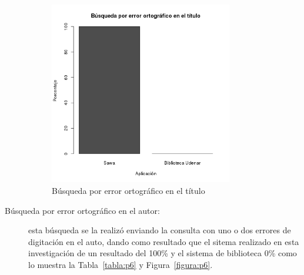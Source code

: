 \begin{description}
  
  \begin{figure}[!ht]
\begin{center}
\includegraphics[width=8cm]{pictures/p5.png}
\end{center}
\caption{Búsqueda por error ortográfico en el título} \label{figura:p5}
\end{figure}

 \newpage
 \item [Búsqueda por error ortográfico en el autor:] esta búsqueda se la realizó enviando la consulta
 con uno o dos errores de digitación en el auto, dando como resultado que el sitema realizado
 en esta investigación de un resultado del 100\% y el sistema de biblioteca 0\% como lo muestra la Tabla~\ref{tabla:p6} y Figura~\ref{figura:p6}.
 
  \begin{center}
\begin{table}[!ht]
\caption{Búsqueda por error ortográfico en el autor} \label{tabla:p6}
\end{table}
\end{center}
 

\end{description}
